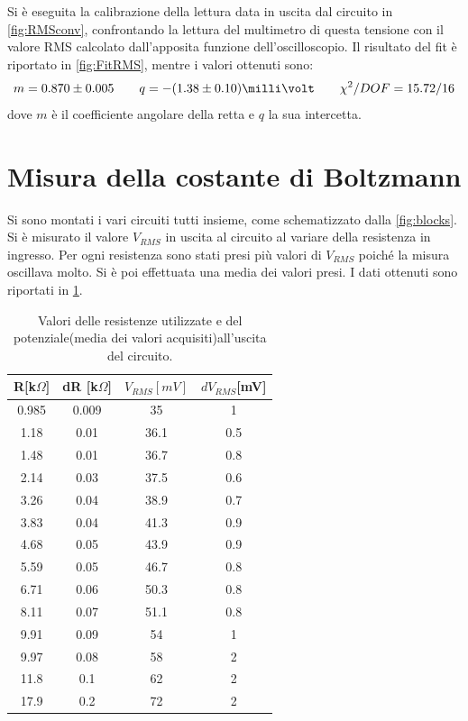 \documentclass[a4paper,10pt]{article}
\begin{document}
Si è eseguita la calibrazione della lettura data in uscita dal circuito in \cref{fig:RMSconv}, confrontando la lettura del multimetro di questa tensione con il valore RMS calcolato dall'apposita funzione dell'oscilloscopio.
Il risultato del fit è riportato in \cref{fig:FitRMS}, mentre i valori ottenuti sono:
\[ m = 0.870 \pm 0.005	\qquad	q = -(1.38\pm0.10) \milli\volt	\qquad	\chi^2/DOF = 15.72 / 16 \]
dove $ m $ è il coefficiente angolare della retta e $ q $ la sua intercetta.


\section{Misura della costante di Boltzmann}
\vspace*{-5pt}
Si sono montati i vari circuiti tutti insieme, come schematizzato dalla \cref{fig:blocks}. Si è misurato il valore $V_{RMS}$ in uscita al circuito al variare della resistenza in ingresso. Per ogni resistenza sono stati presi più valori di $V_{RMS}$ poiché la misura oscillava molto. Si è poi effettuata una media dei valori presi. I dati ottenuti sono riportati in \cref{tab:lastfitav}.
\vspace*{-10pt}
\begin{table}[H]
	\centering
	\begin{tabular}{cccc}
		\hline
		R[k$\Omega$] & dR [k$\Omega$] & $V_{RMS}[mV]$  & $dV_{RMS}$[mV] \\
		\hline
		0.985 & 0.009 & 35 & 1 \\
		1.18 & 0.01 & 36.1 & 0.5 \\
		1.48 & 0.01 & 36.7 & 0.8 \\
		2.14 & 0.03 & 37.5 & 0.6 \\
		3.26 & 0.04 & 38.9 & 0.7 \\
		3.83 & 0.04 & 41.3 & 0.9 \\
		4.68 & 0.05 & 43.9 & 0.9 \\
		5.59 & 0.05 & 46.7 & 0.8 \\
		6.71 & 0.06 & 50.3 & 0.8 \\
		8.11 & 0.07 & 51.1 & 0.8 \\
		9.91 & 0.09 & 54 & 1 \\
		9.97 & 0.08 & 58 & 2 \\
		11.8 & 0.1 & 62 & 2 \\
		17.9 & 0.2 & 72 & 2 \\
		\hline
	\end{tabular}
	\caption{Valori delle resistenze utilizzate e del potenziale(media dei valori acquisiti)all'uscita del circuito.}
	\label{tab:lastfitav}
\end{table}
\end{document}
